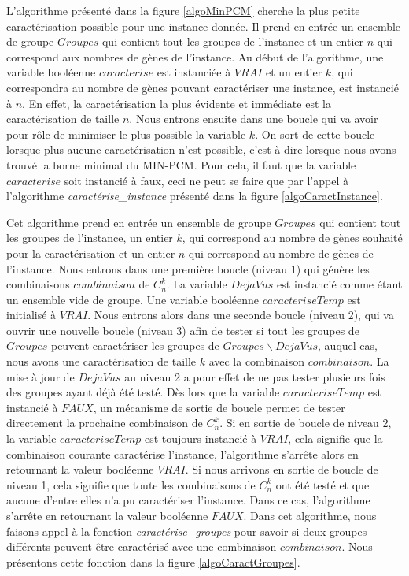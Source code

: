 L'algorithme présenté dans la figure \ref{algoMinPCM} cherche la plus petite caractérisation possible pour une instance donnée. Il prend en entrée un ensemble de groupe $Groupes$ qui contient tout les groupes de l'instance et un entier $n$ qui correspond aux nombres de gènes de l'instance. Au début de l'algorithme, une variable booléenne $caracterise$ est instanciée à $VRAI$ et un entier $k$, qui correspondra au nombre de gènes pouvant caractériser une instance, est instancié à $n$. En effet, la caractérisation la plus évidente et immédiate est la caractérisation de taille $n$. Nous entrons ensuite dans une boucle qui va avoir pour rôle de minimiser le plus possible la variable $k$. On sort de cette boucle lorsque plus aucune caractérisation n'est possible, c'est à dire lorsque nous avons trouvé la borne minimal du MIN-PCM. Pour cela, il faut que la variable $caracterise$ soit instancié à faux, ceci ne peut se faire que par l'appel à l'algorithme \emph{caractérise\_instance} présenté dans la figure \ref{algoCaractInstance}.


Cet algorithme prend en entrée un ensemble de groupe $Groupes$ qui contient tout les groupes de l'instance, un entier $k$, qui correspond au nombre de gènes souhaité pour la caractérisation et un entier $n$ qui correspond au nombre de gènes de l'instance. Nous entrons dans une première boucle (niveau 1) qui génère les combinaisons $combinaison$ de $C_n^k$. La variable $DejaVus$ est instancié comme étant un ensemble vide de groupe. Une variable booléenne $caracteriseTemp$ est initialisé à $VRAI$. Nous entrons alors dans une seconde boucle (niveau 2), qui va ouvrir une nouvelle boucle (niveau 3) afin de tester si tout les groupes de $Groupes$ peuvent caractériser les groupes de $Groupes \backslash DejaVus$, auquel cas, nous avons une caractérisation de taille $k$ avec la combinaison $combinaison$. La mise à jour de $DejaVus$ au niveau 2 a pour effet de ne pas tester plusieurs fois des groupes ayant déjà été testé. Dès lors que la variable $caracteriseTemp$ est instancié à $FAUX$, un mécanisme de sortie de boucle permet de tester directement la prochaine combinaison de $C_n^k$. Si en sortie de boucle de niveau 2, la variable $caracteriseTemp$ est toujours instancié à $VRAI$, cela signifie que la combinaison courante caractérise l'instance, l'algorithme s'arrête alors en retournant la valeur booléenne $VRAI$. Si nous arrivons en sortie de boucle de niveau 1, cela signifie que toute les combinaisons de $C_n^k$ ont été testé et que aucune d'entre elles n'a pu caractériser l'instance. Dans ce cas, l'algorithme s'arrête en retournant la valeur booléenne $FAUX$. Dans cet algorithme, nous faisons appel à la fonction \emph{caractérise\_groupes} pour savoir si deux groupes différents peuvent être caractérisé avec une combinaison $combinaison$. Nous présentons cette fonction dans la figure \ref{algoCaractGroupes}.


